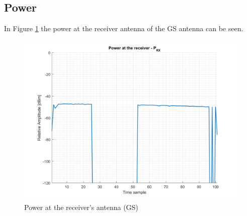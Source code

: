 \subsection{Power}
In Figure \ref{fig:s4_power} the power at the receiver antenna of the GS antenna can be seen.

\begin{figure}[H]
	\centering
	\includegraphics[scale=0.75]{figures/s4_power.png}
	\caption{Power at the receiver's antenna (GS)}
	\label{fig:s4_power}
\end{figure}